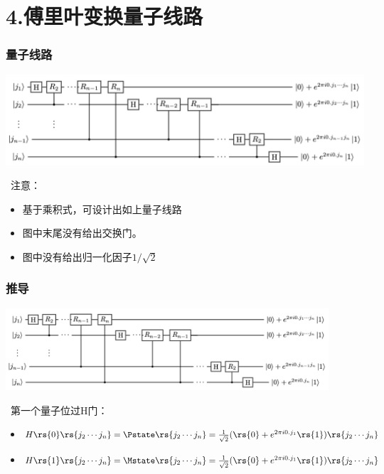\section{4.傅里叶变换量子线路}

\begin{frame}
    \frametitle{量子线路}
    \begin{center}
        \begin{center}
            \includegraphics[width=1.0\textwidth]{figs/37.png}
        \end{center}
    \end{center}  
    {\Bullet}~注意：  \\
    \begin{itemize}
        \item 基于乘积式，可设计出如上量子线路
        \item 图中末尾没有给出交换门。
        \item 图中没有给出归一化因子$1/\sqrt{2}$
    \end{itemize}
\end{frame}

\begin{frame}
    \frametitle{推导}
    \begin{center}
        \begin{center}
            \includegraphics[width=0.9\textwidth]{figs/37.png}
        \end{center}
    \end{center}  
    {\Bullet}~第一个量子位过H门：  \\
    \begin{itemize}
        \item $H\rs{0} \rs{j_2\cdots j_n} = \Pstate \rs{j_2\cdots j_n}= \frac{1}{\sqrt{2}}(\rs{0}+e^{2\pi i 0.j_1}\rs{1}) \rs{j_2\cdots j_n}$
        \item $H\rs{1} \rs{j_2\cdots j_n} = \Mstate \rs{j_2\cdots j_n}= \frac{1}{\sqrt{2}}(\rs{0}+e^{2\pi i 0.j_1}\rs{1}) \rs{j_2\cdots j_n}$
    \end{itemize}
\end{frame}

